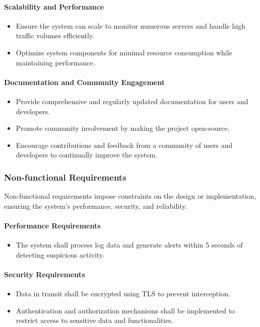 \documentclass{article}
\begin{document}
    \paragraph{Scalability and Performance}
    \begin{itemize}
        \item Ensure the system can scale to monitor numerous servers and handle high traffic volumes efficiently.
        \item Optimize system components for minimal resource consumption while maintaining performance.
    \end{itemize}

    \paragraph{Documentation and Community Engagement}
    \begin{itemize}
        \item Provide comprehensive and regularly updated documentation for users and developers.
        \item Promote community involvement by making the project open-source.
        \item Encourage contributions and feedback from a community of users and developers to continually improve the system.
    \end{itemize}

    \subsubsection{Non-functional Requirements}\label{subsubsec:non-functional-requirements}

    Non-functional requirements impose constraints on the design or implementation, ensuring the system's performance, security, and reliability.

    \paragraph{Performance Requirements}
    \begin{itemize}
        \item The system shall process log data and generate alerts within 5 seconds of detecting suspicious activity.
    \end{itemize}

    \paragraph{Security Requirements}
    \begin{itemize}
        \item Data in transit shall be encrypted using TLS to prevent interception.
        \item Authentication and authorization mechanisms shall be implemented to restrict access to sensitive data and functionalities.
    \end{itemize}
\end{document}
